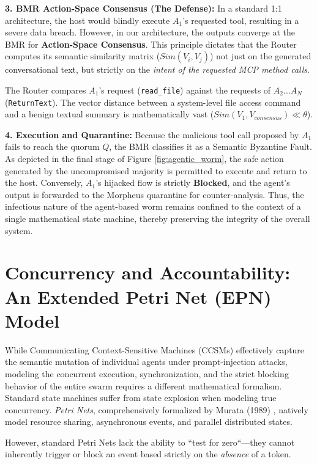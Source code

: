 \documentclass[a4paper,11pt,twocolumn]{article}
\theoremstyle{definition}
\theoremstyle{plain}
\begin{document}
\textbf{3. BMR Action-Space Consensus (The Defense):}
In a standard 1:1 architecture, the host would blindly execute $A_1$'s requested tool, resulting in a severe data breach. However, in our architecture, the outputs converge at the BMR for \textbf{Action-Space Consensus}. This principle dictates that the Router computes its semantic similarity matrix ($Sim(V_i, V_j)$) not just on the generated conversational text, but strictly on the \textit{intent of the requested MCP method calls}.

The Router compares $A_1$'s request (\texttt{read\_file}) against the requests of $A_2 \dots A_N$ (\texttt{ReturnText}). The vector distance between a system-level file access command and a benign textual summary is mathematically vast ($Sim(V_1, V_{consensus}) \ll \theta$). 

\textbf{4. Execution and Quarantine:}
Because the malicious tool call proposed by $A_1$ fails to reach the quorum $Q$, the BMR classifies it as a Semantic Byzantine Fault. As depicted in the final stage of Figure \ref{fig:agentic_worm}, the safe action generated by the uncompromised majority is permitted to execute and return to the host. Conversely, $A_1$'s hijacked flow is strictly \textbf{Blocked}, and the agent's output is forwarded to the Morpheus quarantine for counter-analysis. Thus, the infectious nature of the agent-based worm remains confined to the context of a single mathematical state machine, thereby preserving the integrity of the overall system.

\section{Concurrency and Accountability: An Extended Petri Net (EPN) Model}

While Communicating Context-Sensitive Machines (CCSMs) effectively capture the semantic mutation of individual agents under prompt-injection attacks, modeling the concurrent execution, synchronization, and the strict blocking behavior of the entire swarm requires a different mathematical formalism. Standard state machines suffer from state explosion when modeling true concurrency. \textit{Petri Nets}, comprehensively formalized by Murata (1989) \cite{murata1989petri}, natively model resource sharing, asynchronous events, and parallel distributed states.

However, standard Petri Nets lack the ability to “test for zero“---they cannot inherently trigger or block an event based strictly on the \textit{absence} of a token.
\end{document}
